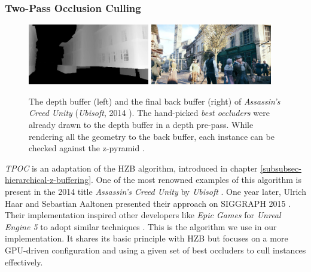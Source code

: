 \subsubsection*{Two-Pass Occlusion Culling} \label{subsubsec-two-pass-occlusion-culling}

\begin{figure}[h]
    \centering
    \includegraphics[width=200px]{images/graphics/depth-buffer-ac-unity.jpg}
    \includegraphics[width=200px]{images/graphics/final-frame-ac-unity.jpg}
    \caption{The depth buffer (left) and the final back buffer (right) of \emph{Assassin's Creed Unity} (\emph{Ubisoft}, 2014 \cite{Ubisoft2014}). 
    The hand-picked \emph{best occluders} were already drawn to the depth buffer in a depth pre-pass.
    While rendering all the geometry to the back buffer, each instance can be checked against the z-pyramid \cite{Kruskonja2022}.}
    \label{fig:depth-buffer-ac-unity}
\end{figure}

\noindent
\emph{\ac{TPOC}} is an adaptation of the \ac{HZB} algorithm, introduced in chapter \ref{subsubsec-hierarchical-z-buffering}. 
One of the most renowned examples of this algorithm is present in the 2014 title \emph{Assassin's Creed Unity} by \emph{Ubisoft} 
\cite{Ubisoft2014}. One year later, Ulrich Haar and Sebastian Aaltonen presented their approach on SIGGRAPH 2015 
\cite{Aaltonen2015}. Their implementation inspired other developers like \emph{Epic Games} for \emph{Unreal Engine 5} 
to adopt similar techniques \cite{Karis2021}. This is the algorithm we use in our implementation. It shares its basic 
principle with \ac{HZB} but focuses on a more \ac{GPU}-driven configuration and using a given set of best occluders to 
cull instances effectively. \\

